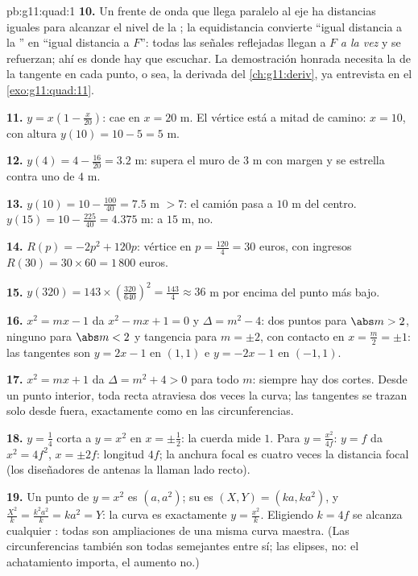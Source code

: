 \begin{solution}{pb:g11:quad:1}
\textbf{10.} Un frente de onda que llega paralelo al eje ha 
distancias iguales para alcanzar el nivel de la ; la
equidistancia convierte ``igual distancia a la '' en ``igual
distancia a $F$'': todas las señales reflejadas llegan a $F$ \emph{a la
vez} y se refuerzan; ahí es donde hay que escuchar. La demostración
honrada necesita la  de la tangente en cada punto, o sea, la
derivada del \cref{ch:g11:deriv}, ya entrevista en el
\cref{exo:g11:quad:11}.

\textbf{11.} $y = x\left(1 - \frac{x}{20}\right)$: cae en $x = 20$ m. El
vértice está a mitad de camino: $x = 10$, con altura
$y(10) = 10 - 5 = 5$ m.

\textbf{12.} $y(4) = 4 - \frac{16}{20} = 3.2$ m: supera el muro de $3$ m
con margen y se estrella contra uno de $4$ m.

\textbf{13.} $y(10) = 10 - \frac{100}{40} = 7.5$ m $> 7$: el camión pasa a
$10$ m del centro. $y(15) = 10 - \frac{225}{40} = 4.375$ m: a $15$ m, no.

\textbf{14.} $R(p) = -2p^2 + 120p$: vértice en
$p = \frac{120}{4} = 30$ euros, con ingresos
$R(30) = 30 \times 60 = 1\,800$ euros.

\textbf{15.} $y(320) = 143 \times \left(\frac{320}{640}\right)^2
= \frac{143}{4} \approx 36$ m por encima del punto más bajo.

\textbf{16.} $x^2 = mx - 1$ da $x^2 - mx + 1 = 0$ y $\Delta = m^2 - 4$:
dos puntos para $\abs m > 2$, ninguno para $\abs m < 2$ y tangencia para
$m = \pm 2$, con contacto en $x = \frac m2 = \pm 1$: las tangentes son
$y = 2x - 1$ en $(1, 1)$ e $y = -2x - 1$ en $(-1, 1)$.

\textbf{17.} $x^2 = mx + 1$ da $\Delta = m^2 + 4 > 0$ para todo $m$:
siempre hay dos cortes. Desde un punto interior, toda recta atraviesa dos
veces la curva; las tangentes se trazan solo desde fuera, exactamente como
en las circunferencias.

\textbf{18.} $y = \frac14$ corta a $y = x^2$ en $x = \pm\frac12$: la
cuerda mide $1$. Para $y = \frac{x^2}{4f}$: $y = f$ da $x^2 = 4f^2$,
$x = \pm 2f$: longitud $4f$; la anchura focal es cuatro veces la distancia
focal (los diseñadores de antenas la llaman lado recto).

\textbf{19.} Un punto de $y = x^2$ es $(a, a^2)$; su  es
$(X, Y) = (ka, ka^2)$, y $\frac{X^2}{k} = \frac{k^2a^2}{k} = ka^2 = Y$: la
curva  es exactamente $y = \frac{x^2}{k}$. Eligiendo $k = 4f$ se
alcanza cualquier : todas son ampliaciones de una misma curva
maestra. (Las circunferencias también son todas semejantes entre sí; las
elipses, no: el achatamiento importa, el aumento no.)


\end{solution}
